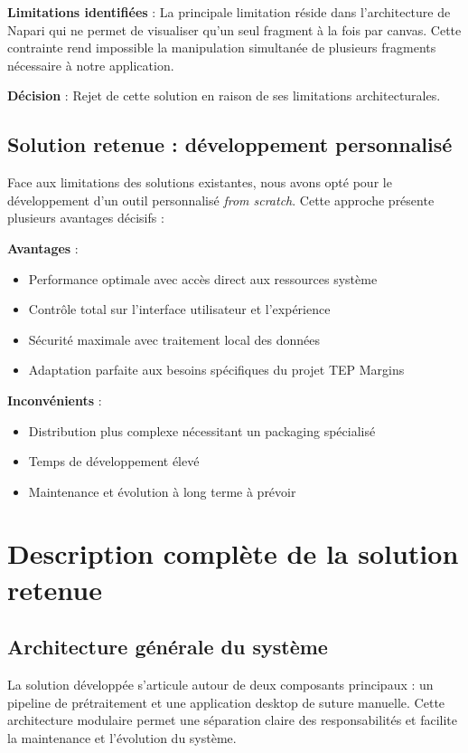 \documentclass[12pt,a4paper]{report}
\begin{document}
\textbf{Limitations identifiées} : La principale limitation réside dans l'architecture de Napari qui ne permet de visualiser qu'un seul fragment à la fois par canvas. Cette contrainte rend impossible la manipulation simultanée de plusieurs fragments nécessaire à notre application.

\textbf{Décision} : Rejet de cette solution en raison de ses limitations architecturales.

\subsection{Solution retenue : développement personnalisé}

Face aux limitations des solutions existantes, nous avons opté pour le développement d'un outil personnalisé \textit{from scratch}. Cette approche présente plusieurs avantages décisifs :

\textbf{Avantages} :
\begin{itemize}
\item Performance optimale avec accès direct aux ressources système
\item Contrôle total sur l'interface utilisateur et l'expérience
\item Sécurité maximale avec traitement local des données
\item Adaptation parfaite aux besoins spécifiques du projet TEP Margins
\end{itemize}

\textbf{Inconvénients} :
\begin{itemize}
\item Distribution plus complexe nécessitant un packaging spécialisé
\item Temps de développement élevé
\item Maintenance et évolution à long terme à prévoir
\end{itemize}

\section{Description complète de la solution retenue}

\clearpage

\subsection{Architecture générale du système}

La solution développée s'articule autour de deux composants principaux : un pipeline de prétraitement et une application desktop de suture manuelle. Cette architecture modulaire permet une séparation claire des responsabilités et facilite la maintenance et l'évolution du système.
\end{document}
